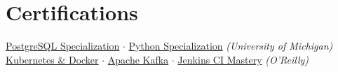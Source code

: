 \section{Certifications}
\noindent
\href{https://www.coursera.org/account/accomplishments/specialization/certificate/CHA8DBWBGJ2K}{PostgreSQL Specialization} \quad$\cdot$\quad
\href{https://www.coursera.org/account/accomplishments/specialization/certificate/U87UNMWZD8H5}{Python Specialization} \hfill \textit{(University of Michigan)} \\

\href{https://www.credly.com/badges/1ad9c31b-d78e-43a3-a4e3-5d22417fdbae/public_url}{Kubernetes \& Docker}
\quad$\cdot$\quad
\href{https://www.credly.com/badges/958596c2-4662-409c-a277-3ef6852411f3/public_url}{Apache Kafka}
\quad$\cdot$\quad
\href{https://www.credly.com/badges/87c61572-8d48-478a-96d3-7c771e21b9f4/public_url}{Jenkins CI Mastery} \hfill \textit{(O'Reilly)}
